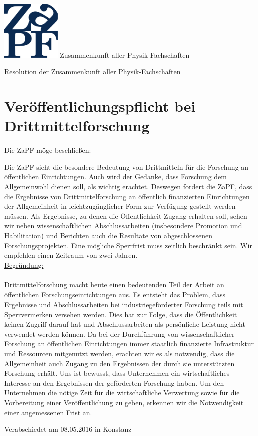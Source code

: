 \documentclass[DIV=calc]{scrartcl}
\begin{document}
\hspace{0.87\textwidth}
\begin{minipage}{120pt}
\vspace{-1.8cm}
\includegraphics[width=80pt]{logo.pdf}
\centering
\small Zusammenkunft aller Physik-Fachschaften
\end{minipage}
\begin{center}
\huge{Resolution der Zusammenkunft aller Physik-Fachschaften} \\
\normalsize
\end{center}

\vspace{1cm}
\section*{Ver\"offentlichungspflicht bei Drittmittelforschung}

Die ZaPF m\"oge beschließen:

Die ZaPF sieht die besondere Bedeutung von Drittmitteln für die Forschung an \"offentlichen Einrichtungen. Auch wird der Gedanke, dass Forschung dem Allgemeinwohl dienen soll, als wichtig erachtet. Deswegen fordert die ZaPF, dass die Ergebnisse von Drittmittelforschung an \"offentlich finanzierten Einrichtungen der Allgemeinheit in leichtzugänglicher Form zur Verfügung gestellt werden müssen. Als Ergebnisse, zu denen die \"Offentlichkeit Zugang erhalten soll, sehen wir neben wissenschaftlichen Abschlussarbeiten (insbesondere Promotion und Habilitation) und Berichten auch die Resultate von abgeschlossenen Forschungsprojekten. Eine m\"ogliche Sperrfrist muss zeitlich beschränkt sein. Wir empfehlen einen Zeitraum von zwei Jahren.\\

\underline{Begr\"undung:}\\\\
Drittmittelforschung macht heute einen bedeutenden Teil der Arbeit an \"offentlichen Forschungseinrichtungen aus. Es entsteht das Problem, dass Ergebnisse und Abschlussarbeiten bei industriegef\"orderter Forschung teils mit Sperrvermerken versehen werden. Dies hat zur Folge, dass die \"Offentlichkeit keinen Zugriff darauf hat und Abschlussarbeiten als pers\"onliche Leistung nicht verwendet werden k\"onnen. Da bei der Durchführung von wissenschaftlicher Forschung an \"offentlichen Einrichtungen immer staatlich finanzierte Infrastruktur und Ressourcen mitgenutzt werden, erachten wir es als notwendig, dass die Allgemeinheit auch Zugang zu den Ergebnissen der durch sie unterstützten Forschung erhält. Uns ist bewusst, dass Unternehmen ein wirtschaftliches Interesse an den Ergebnissen der gef\"orderten Forschung haben. Um den Unternehmen die n\"otige Zeit für die wirtschaftliche Verwertung sowie für die Vorbereitung einer Ver\"offentlichung zu geben, erkennen wir die Notwendigkeit einer angemessenen Frist an.

\vfill
\begin{flushright}
Verabschiedet am 08.05.2016 in Konstanz
\end{flushright}
\end{document}
